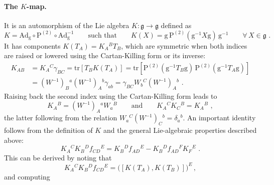 \documentclass[12pt]{article}
\numberwithin{equation}{section}
\begin{document}
\paragraph{The $K$-map.}
It is an automorphism of the Lie algebra $K:\mathfrak{g}\rightarrow \mathfrak{g}$ defined as
\begin{equation}\label{K-map-definition}
K=\mathrm{Ad}_{\mathrm{g}} \circ\mathrm{P}^{(2)}\circ \mathrm{Ad}_{\mathrm{g}}^{-1}
\qquad \text{such that} \qquad
K(X)=\mathrm{g} \, \mathrm{P}^{(2)}(\mathrm{g}^{-1}X \mathrm{g}) \, \mathrm{g}^{-1}
\qquad \forall \, X \in \mathfrak{g} \,\, .
\end{equation}
It has components $K(T_{A})=K_{A}{}^{B}T_{B}$, which are symmetric when both indices are raised or lowered using the Cartan-Killing form or its inverse:
\begin{equation}
\begin{aligned}
K_{AB}&=K_{A}{}^{C}\gamma_{BC}=\mathrm{tr}[T_{B}K(T_{A})]=\mathrm{tr}[\mathrm{P}^{(2)}(\mathrm{g}^{-1}T_{B}\mathrm{g}) \, \mathrm{P}^{(2)}(\mathrm{g}^{-1}T_{A}\mathrm{g})] 
\\
& = (W^{-1})_{B}{}^{a}(W^{-1})_{A}{}^{b}\gamma_{ab} = \gamma_{BC}W_{b}{}^{C}(W^{-1})_{A}{}^{b} \,\, .
\end{aligned}
\end{equation}
Raising back the second index using the Cartan-Killing form leads to
\begin{equation}\label{K-in-terms-of-W}
K_{A}{}^{B}=(W^{-1})_{A}{}^{a}W_{a}{}^{B} 
\qquad \text{and} \qquad 
K_{A}{}^{C}K_{C}{}^{B}=K_{A}{}^{B} \,\, ,
\end{equation}
the latter following from the relation $W_{a}{}^{C}(W^{-1})_{C}{}^{b}=\delta_{a}{}^{b}$. An important identity follows from the definition of $K$ and the general Lie-algebraic properties described above:
\begin{equation}\label{important-K-relation}
K_{A}{}^{C}K_{B}{}^{D}f_{CD}{}^{E}=K_{B}{}^{D}f_{AD}{}^{E}-K_{B}{}^{D}f_{AD}{}^{F}K_{F}{}^{E} \,\, .
\end{equation}
This can be derived by noting that
\begin{equation}
K_{A}{}^{C}K_{B}{}^{D}f_{CD}{}^{E} = \bigl( [K(T_{A}),K(T_{B})] \bigr)^{E} \, ,
\end{equation}
and computing
\end{document}
